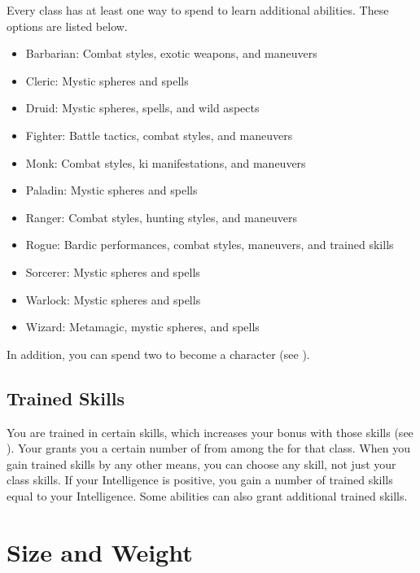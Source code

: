     Every class has at least one way to spend  to learn additional abilities.
    These options are listed below.
    \begin{itemize}
      \item Barbarian: Combat styles, exotic weapons, and maneuvers
      \item Cleric: Mystic spheres and spells
      \item Druid: Mystic spheres, spells, and wild aspects
      \item Fighter: Battle tactics, combat styles, and maneuvers
      \item Monk: Combat styles, ki manifestations, and maneuvers
      \item Paladin: Mystic spheres and spells
      \item Ranger: Combat styles, hunting styles, and maneuvers
      \item Rogue: Bardic performances, combat styles, maneuvers, and trained skills
      \item Sorcerer: Mystic spheres and spells
      \item Warlock: Mystic spheres and spells
      \item Wizard: Metamagic, mystic spheres, and spells
    \end{itemize}

    In addition, you can spend two  to become a  character (see ).

  \subsection{Trained Skills}\label{Trained Skills}
    You are trained in certain skills, which increases your bonus with those skills (see ).
    Your  grants you a certain number of  from among the  for that class.
    When you gain trained skills by any other means, you can choose any skill, not just your class skills.
    If your Intelligence is positive, you gain a number of trained skills equal to your Intelligence.
    Some abilities can also grant additional trained skills.

\section{Size and Weight}\label{Size and Weight}

